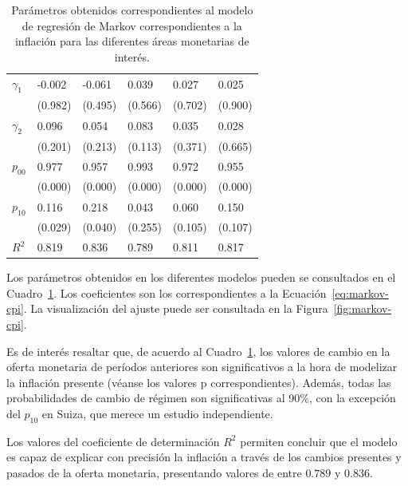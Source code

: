 \documentclass[titlepage, 12pt]{article}
\begin{document}
\begin{table}
\begin{tabular}{llllll}
        $\gamma_1$        & -0.002         & -0.061   & 0.039   & 0.027       & 0.025   \\
                          & (0.982)        & (0.495)  & (0.566) & (0.702)     & (0.900) \\
        $\gamma_2$        & 0.096          & 0.054    & 0.083   & 0.035       & 0.028   \\
                          & (0.201)        & (0.213)  & (0.113) & (0.371)     & (0.665) \\
        $p_{00}$          & 0.977          & 0.957    & 0.993   & 0.972       & 0.955   \\
                          & (0.000)        & (0.000)  & (0.000) & (0.000)     & (0.000) \\
        $p_{10}$          & 0.116          & 0.218    & 0.043   & 0.060       & 0.150   \\
                          & (0.029)        & (0.040)  & (0.255) & (0.105)     & (0.107) \\
        $R^2$             & 0.819          & 0.836    & 0.789   & 0.811       & 0.817   \\
        \bottomrule
    \end{tabular}
    \caption{Parámetros obtenidos correspondientes al modelo de regresión de Markov correspondientes a la inflación para las diferentes áreas monetarias de interés.}
    \label{tab:cpi-markov-params}
\end{table}


Los parámetros obtenidos en los diferentes modelos pueden se consultados en el Cuadro~\ref{tab:cpi-markov-params}. Los coeficientes son los correspondientes a la Ecuación~\ref{eq:markov-cpi}. La visualización del ajuste puede ser consultada en la Figura~\ref{fig:markov-cpi}.

Es de interés resaltar que, de acuerdo al Cuadro~\ref{tab:cpi-markov-params}, los valores de cambio en la oferta monetaria de períodos anteriores son significativos a la hora de modelizar la inflación presente (véanse los valores p correspondientes). Además, todas las probabilidades de cambio de régimen son significativas al 90\%, con la excepción del $p_{10}$ en Suiza, que merece un estudio independiente.

Los valores del coeficiente de determinación $R^2$ permiten concluir que el modelo es capaz de explicar con precisión la inflación a través de los cambios presentes y pasados de la oferta monetaria, presentando valores de entre $0.789$ y $0.836$.
\end{document}
